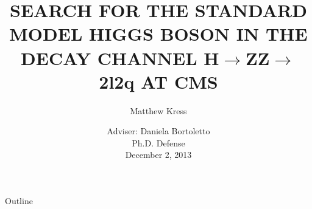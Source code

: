 \documentclass{beamer}
\title[H$\rightarrow$ZZ$\rightarrow$2l2q] %
{SEARCH FOR THE STANDARD MODEL HIGGS BOSON IN THE DECAY CHANNEL H$\rightarrow$ZZ$\rightarrow$2l2q AT CMS}
\author[Matthew Kress] %
{Matthew Kress}
\institute[Purdue University] %
\date[December 2, 2013] %
{Adviser: Daniela Bortoletto
\\

Ph.D. Defense
\\
December 2, 2013
}
\begin{document}
\begin{frame}
  \titlepage
\end{frame}

\begin{frame}{Outline}
  \tableofcontents
\end{frame}




\end{document}
